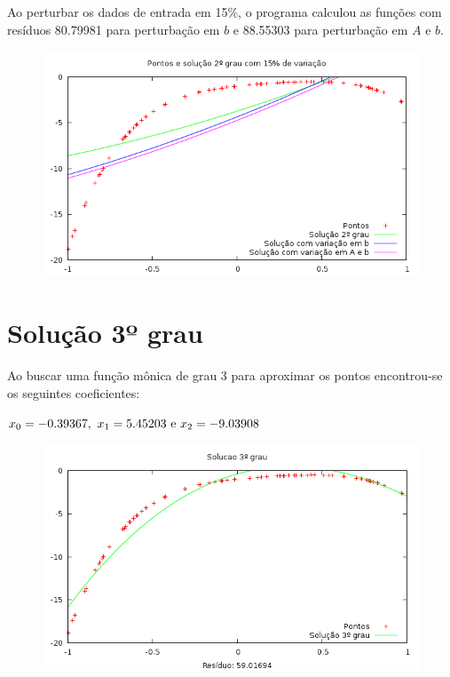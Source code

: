 Ao perturbar os dados de entrada em 15\%, o programa calculou as funções 
com resíduos 80.79981 para perturbação em $b$ e 88.55303 para perturbação em $A$ e $b$.

\begin{figure}[h]
\centering
\includegraphics[scale=0.7]{sol2grau_var}
\end{figure}


\newpage
\section{Solução 3º grau}

Ao buscar uma função mônica de grau 3 para aproximar os pontos encontrou-se os seguintes 
coeficientes:

\(x_0 = -0.39367  ,~  x_1 = 5.45203  ~$e$~ x_2 = -9.03908 \)

\begin{figure}[h]
\centering
\includegraphics[scale=0.7]{sol3grau}
\end{figure}

